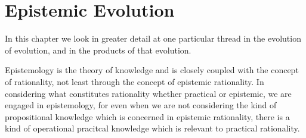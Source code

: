 \chapter{Epistemic Evolution}\label{EpistemicEvolution}

In this chapter we look in greater detail at one particular thread in the evolution of evolution, and in the products of that evolution.

Epistemology is the theory of knowledge and is closely coupled with the concept of rationality, not least through the concept of epistemic rationality.
In considering what constitutes rationality whether practical or epistemic, we are engaged in epistemology, for even when we are not considering the kind of propositional knowledge which is concerned in epistemic rationality, there is a kind of operational pracitcal knowledge which is relevant to practical rationality.
